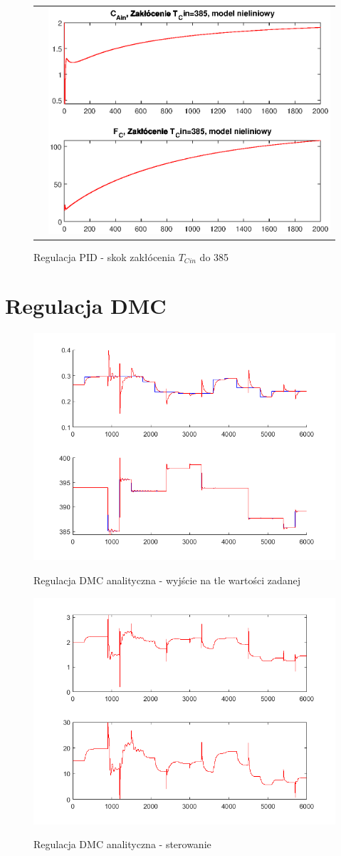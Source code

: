 \begin{figure}
\begin{tabular}{cc}
	&
	\includegraphics[width=.5\linewidth]{img/pidnlin/pidnlin15.eps}
\end{tabular}
\label{ch2:pid8}
\caption{Regulacja PID - skok zakłócenia $T_{Cin}$ do 385}
\end{figure}

\section{Regulacja DMC}
\begin{figure}[h!]
	\centering
	\includegraphics[width=.6\linewidth]{img/yDMC.png}
	\label{ch2:dmcana}
	\caption{Regulacja DMC analityczna - wyjście na tle wartości zadanej}
\end{figure}
\begin{figure}[h!]
	\centering
	\includegraphics[width=.6\linewidth]{img/uDMC.png}
	\label{ch2:dmcanaster}
	\caption{Regulacja DMC analityczna - sterowanie}
\end{figure}
